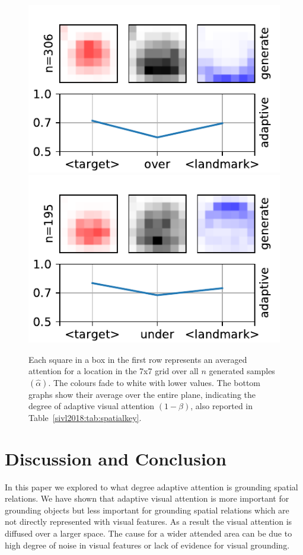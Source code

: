 \begin{figure}[ht]%
    \centering
    \includegraphics[width=0.4\linewidth]{studies/sivl2018/figures/over-adaptive.pdf}
    \includegraphics[width=0.4\linewidth]{studies/sivl2018/figures/under-adaptive.pdf}
    \vspace{0.5em}
    \caption{
   	Each square in a box in the first row represents an averaged attention for a location in the 7x7 grid over all $n$ generated samples $(\hat{\alpha})$. The colours fade to white with lower values. The bottom graphs show their average over the entire plane, indicating the degree of adaptive visual attention $(1-\beta)$, also reported in Table~\ref{sivl2018:tab:spatialkey}.}\label{sivl2018:fig:images}
\end{figure}

\section{Discussion and Conclusion}

In this paper we explored to what degree adaptive attention is grounding
spatial relations. We have shown that adaptive visual attention is more
important for grounding objects but less important for grounding spatial
relations which are not directly represented with visual features.
As a result the visual attention is diffused over a larger space. The
cause for a wider attended area can be due to high degree of
noise in visual features or lack of evidence for visual grounding.

